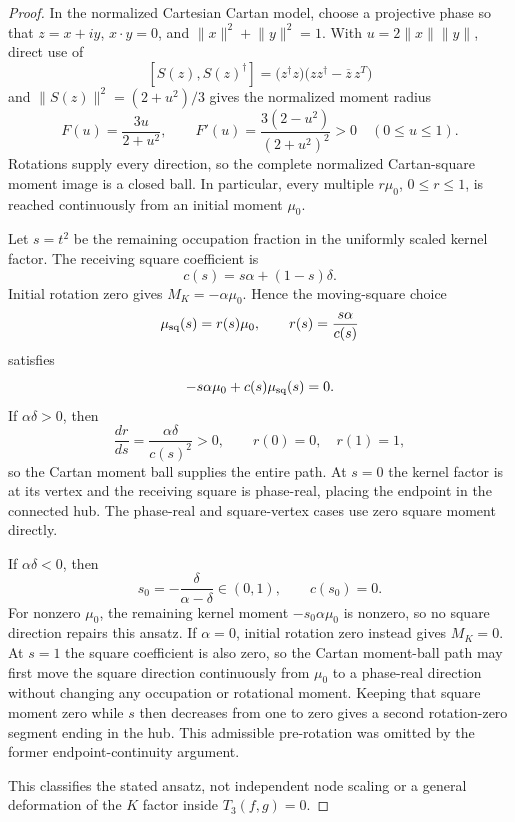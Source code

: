 \documentclass[11pt]{article}
\theoremstyle{definition}
\theoremstyle{remark}
\begin{document}
\begin{proof}
In the normalized Cartesian Cartan model, choose a projective phase so that
\(z=x+iy\), \(x\cdot y=0\), and
\(\lVert x\rVert^2+\lVert y\rVert^2=1\).  With
\(u=2\lVert x\rVert\lVert y\rVert\), direct use of
\[
 [S(z),S(z)^\dagger]
 =\bigl(z^\dagger z\bigr)
  \bigl(zz^\dagger-\overline z\,z^T\bigr)
\]
and
\(\lVert S(z)\rVert^2=(2+u^2)/3\) gives the normalized moment radius
\[
 F(u)=\frac{3u}{2+u^2},
 \qquad
 F'(u)=\frac{3(2-u^2)}{(2+u^2)^2}>0
 \quad(0\leq u\leq1).
\]
Rotations supply every direction, so the complete normalized
Cartan-square moment image is a closed ball.  In particular, every multiple
\(r\mu_0\), \(0\leq r\leq1\), is reached continuously from an initial
moment \(\mu_0\).

Let \(s=t^2\) be the remaining occupation fraction in the uniformly scaled
kernel factor.  The receiving square coefficient is
\[
 c(s)=s\alpha+(1-s)\delta.
\]
Initial rotation zero gives \(M_K=-\alpha\mu_0\).  Hence the moving-square
choice
\[
 \mu_{\rm sq}(s)=r(s)\mu_0,
 \qquad
 r(s)=\frac{s\alpha}{c(s)}
\]
satisfies
\[
 -s\alpha\mu_0+c(s)\mu_{\rm sq}(s)=0.
\]
If \(\alpha\delta>0\), then
\[
 \frac{dr}{ds}=\frac{\alpha\delta}{c(s)^2}>0,
 \qquad r(0)=0,\quad r(1)=1,
\]
so the Cartan moment ball supplies the entire path.  At \(s=0\) the kernel
factor is at its vertex and the receiving square is phase-real, placing the
endpoint in the connected hub.  The phase-real and square-vertex cases use
zero square moment directly.

If \(\alpha\delta<0\), then
\[
 s_0=-\frac{\delta}{\alpha-\delta}\in(0,1),
 \qquad c(s_0)=0.
\]
For nonzero \(\mu_0\), the remaining kernel moment
\(-s_0\alpha\mu_0\) is nonzero, so no square direction repairs this ansatz.
If \(\alpha=0\), initial rotation zero instead gives \(M_K=0\).  At
\(s=1\) the square coefficient is also zero, so the Cartan moment-ball path
may first move the square direction continuously from \(\mu_0\) to a
phase-real direction without changing any occupation or rotational moment.
Keeping that square moment zero while \(s\) then decreases from one to zero
gives a second rotation-zero segment ending in the hub.  This admissible
pre-rotation was omitted by the former endpoint-continuity argument.

This classifies the stated ansatz, not independent node scaling or a general
deformation of the \(K\) factor inside \(T_3(f,g)=0\).
\end{proof}
\end{document}
